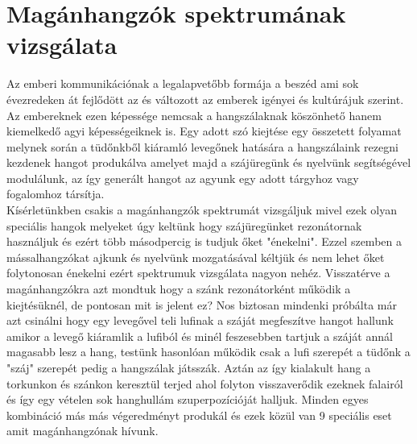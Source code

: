 \documentclass[a4paper,12pt]{article}
\begin{document}
\section{Magánhangzók spektrumának vizsgálata}
Az emberi kommunikációnak a legalapvetőbb formája a beszéd ami sok évezredeken át fejlődött az és változott az emberek igényei és kultúrájuk szerint. Az embereknek ezen képessége nemcsak a hangszálaknak köszönhető hanem kiemelkedő agyi képességeiknek is. Egy adott szó kiejtése egy összetett folyamat melynek során a tüdőnkből kiáramló levegőnek hatására a hangszálaink rezegni kezdenek hangot produkálva amelyet majd a szájüregünk és nyelvünk segítségével modulálunk, az így generált hangot az agyunk egy adott tárgyhoz vagy fogalomhoz társítja.\\ 
Kísérletünkben csakis a magánhangzók spektrumát vizsgáljuk mivel ezek olyan speciális hangok melyeket úgy keltünk hogy szájüregünket rezonátornak használjuk és ezért több másodpercig is tudjuk őket "énekelni". Ezzel szemben a mássalhangzókat ajkunk és nyelvünk mozgatásával kéltjük és nem lehet őket folytonosan énekelni ezért spektrumuk vizsgálata nagyon nehéz. Visszatérve a magánhangzókra azt mondtuk hogy a szánk rezonátorként működik a kiejtésüknél, de pontosan mit is jelent ez? Nos biztosan mindenki próbálta már azt csinálni hogy egy levegővel teli lufinak a száját megfeszítve hangot hallunk amikor a levegő kiáramlik a lufiból és minél feszesebben tartjuk a száját annál magasabb lesz a hang, testünk hasonlóan működik csak a lufi szerepét a tüdőnk a "száj" szerepét pedig a hangszálak játsszák. Aztán az így kialakult hang a torkunkon és szánkon keresztül terjed ahol folyton visszaverődik ezeknek falairól és így egy vételen sok hanghullám szuperpozícióját halljuk. Minden egyes kombináció más más végeredményt produkál és ezek közül van 9 speciális eset amit magánhangzónak hívunk. 

\end{document}
